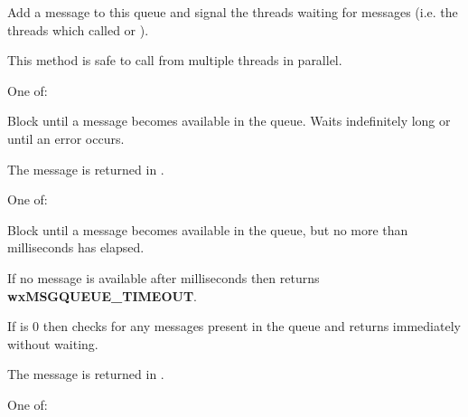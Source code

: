 \label{wxmessagequeuepost}


Add a message to this queue and signal the threads waiting for messages
(i.e. the threads which called  or
).

This method is safe to call from multiple threads in parallel.


One of:

\twocolwidtha{7cm}
\begin{twocollist}\itemsep=0pt
\end{twocollist}


\label{wxmessagequeuereceive}


Block until a message becomes available in the queue. Waits indefinitely long
or until an error occurs.

The message is returned in .


One of:

\twocolwidtha{7cm}
\begin{twocollist}\itemsep=0pt
\end{twocollist}


\label{wxmessagequeuereceive}


Block until a message becomes available in the queue, but no more than
 milliseconds has elapsed.

If no message is available after  milliseconds then returns
{\bf wxMSGQUEUE\_TIMEOUT}.

If  is $0$ then checks for any messages present in the queue
and returns immediately without waiting.

The message is returned in .


One of:

\twocolwidtha{7cm}
\begin{twocollist}\itemsep=0pt
\end{twocollist}

